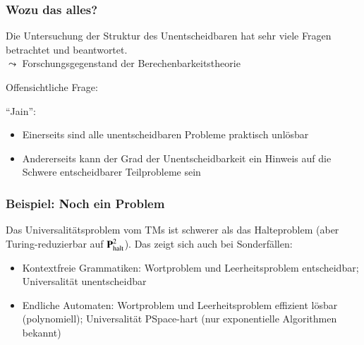 \documentclass[onlymath]{beamer}
\begin{document}
\begin{frame}\frametitle{Wozu das alles?}

Die Untersuchung der Struktur des Unentscheidbaren hat
sehr viele Fragen betrachtet und beantwortet.\\
$\leadsto$ Forschungsgegenstand der \alert{Berechenbarkeitstheorie}
\bigskip\pause

Offensichtliche Frage: 
\bigskip\pause

"`Jain"':
\begin{itemize}
\item Einerseits sind alle unentscheidbaren Probleme praktisch unlösbar
\item Andererseits kann der Grad der Unentscheidbarkeit ein Hinweis auf die Schwere
entscheidbarer Teilprobleme sein
\end{itemize}

\end{frame}

\begin{frame}\frametitle{Beispiel: Noch ein Problem}


\pause Das Universalitätsproblem vom TMs ist schwerer als das Halteproblem (aber Turing-reduzierbar auf $\textbf{\textcolor{black}{P}}^2_{\text{halt}}$). Das zeigt sich auch bei Sonderfällen:
\begin{itemize}
\item \alert{Kontextfreie Grammatiken:} Wortproblem und Leerheitsproblem entscheidbar; Universalität unentscheidbar
\item \alert{Endliche Automaten:} Wortproblem und Leerheitsproblem effizient lösbar (polynomiell); Universalität PSpace-hart (nur exponentielle Algorithmen bekannt)
\end{itemize}

\end{frame}

\end{document}
